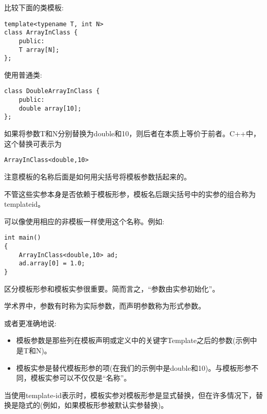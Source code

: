 
比较下面的类模板:

\begin{lstlisting}[style=styleCXX]
template<typename T, int N>
class ArrayInClass {
	public:
	T array[N];
};
\end{lstlisting}

使用普通类:

\begin{lstlisting}[style=styleCXX]
class DoubleArrayInClass {
	public:
	double array[10];
};
\end{lstlisting}

如果将参数T和N分别替换为double和10，则后者在本质上等价于前者。C++中，这个替换可表示为

\begin{lstlisting}[style=styleCXX]
ArrayInClass<double,10>
\end{lstlisting}

注意模板的名称后面是如何用尖括号将模板参数括起来的。

不管这些实参本身是否依赖于模板形参，模板名后跟尖括号中的实参的组合称为templateid。

可以像使用相应的非模板一样使用这个名称。例如:

\begin{lstlisting}[style=styleCXX]
int main()
{
	ArrayInClass<double,10> ad;
	ad.array[0] = 1.0;
}
\end{lstlisting}

区分模板形参和模板实参很重要。简而言之，“参数由实参初始化”。

\begin{tcolorbox}[colback=webgreen!5!white,colframe=webgreen!75!black]
\hspace*{0.75cm}学术界中，参数有时称为实际参数，而声明参数称为形式参数。
\end{tcolorbox}

或者更准确地说:

\begin{itemize}
\item 
模板参数是那些列在模板声明或定义中的关键字Template之后的参数(示例中是T和N)。

\item 
模板实参是替代模板形参的项(在我们的示例中是double和10)。与模板形参不同，模板实参可以不仅仅是“名称”。

\end{itemize}

当使用template-id表示时，模板实参对模板形参是显式替换，但在许多情况下，替换是隐式的(例如，如果模板形参被默认实参替换)。

